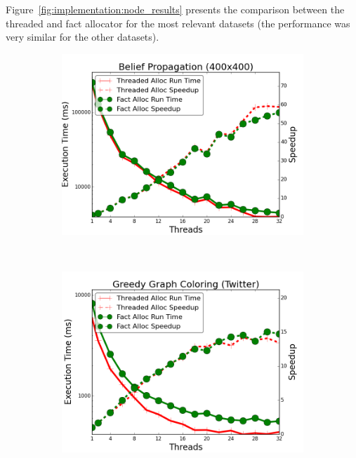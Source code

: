 Figure~\ref{fig:implementation:node_results} presents the comparison between the
threaded and fact allocator for the most relevant datasets (the performance
was very similar for the other datasets).

\begin{figure}[h]
        \begin{subfigure}[b]{\smallplotsize\textwidth}
                \includegraphics[width=\textwidth]{experiments/scalability/node-allocator-belief-propagation-400.png}
                \label{fig:implementation:node_bp}
        \end{subfigure}
        ~
        \begin{subfigure}[b]{\smallplotsize\textwidth}
                \includegraphics[width=\textwidth]{experiments/scalability/node-allocator-greedy-graph-coloring-twitter.png}

\end{subfigure}
\end{figure}
